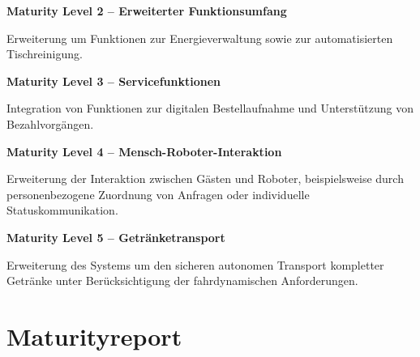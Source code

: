 \documentclass[
  a4paper,
  12pt,
  DIV=12,        %
  parskip=half,  %
  headings=small %
]{scrartcl}
\theoremstyle{definition}
\theoremstyle{definition}
\begin{document}
\textbf{Maturity Level 2 -- Erweiterter Funktionsumfang}

Erweiterung um Funktionen zur Energieverwaltung sowie zur
automatisierten Tischreinigung.

\textbf{Maturity Level 3 -- Servicefunktionen}

Integration von Funktionen zur digitalen Bestellaufnahme und
Unterstützung von Bezahlvorgängen.

\textbf{Maturity Level 4 -- Mensch-Roboter-Interaktion}

Erweiterung der Interaktion zwischen Gästen und Roboter, beispielsweise
durch personenbezogene Zuordnung von Anfragen oder individuelle
Statuskommunikation.

\textbf{Maturity Level 5 -- Getränketransport}

Erweiterung des Systems um den sicheren autonomen Transport kompletter
Getränke unter Berücksichtigung der fahrdynamischen Anforderungen.



\section{Maturityreport}\label{maturityreport}
\end{document}
